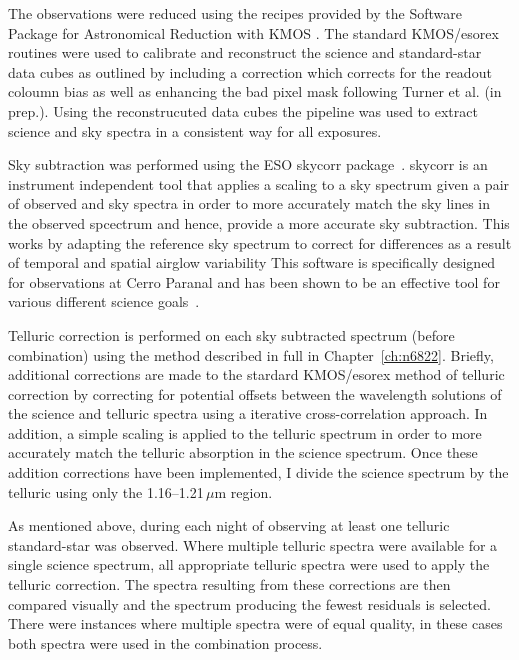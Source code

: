 The observations were reduced using the recipes provided by the Software Package for Astronomical Reduction with KMOS
\citep[SPARK;][]{2013A&A...558A..56D}.
The standard KMOS/esorex routines were used to calibrate and reconstruct the science and standard-star data cubes as outlined by
\cite{2013A&A...558A..56D} including a correction which corrects for the readout coloumn bias as well as enhancing the bad pixel mask following Turner et al. (in prep.).
Using the reconstrucuted data cubes the pipeline was used to extract science and sky spectra in a consistent way for all exposures.

Sky subtraction was performed using the ESO {\sc skycorr} package~\citep{2014A&A...567A..25N}.
{\sc skycorr} is an instrument independent tool that applies a scaling to a sky spectrum given a pair of observed and sky spectra in order to more accurately match the sky lines in the observed spcectrum and hence, provide a more accurate sky subtraction.
This works by adapting the reference sky spectrum to correct for differences as a result of temporal and spatial airglow variability
This software is specifically designed for observations at Cerro Paranal and has been shown to be an effective tool for various different science goals~\citep[e.g.][]{2014A&A...567A..25N,2015ApJ...805..182G,2016MNRAS.455.2028F,2016MNRAS.457.1468L}.

Telluric correction is performed on each sky subtracted spectrum (before combination) using the method described in full in Chapter~\ref{ch:n6822}.
Briefly, additional corrections are made to the stardard KMOS/esorex method of telluric correction by correcting for potential offsets between the wavelength solutions of the science and telluric spectra using a iterative cross-correlation approach.
In addition, a simple scaling is applied to the telluric spectrum in order to more accurately match the telluric absorption in the science spectrum.
Once these addition corrections have been implemented, I divide the science spectrum by the telluric using only the 1.16--1.21\,$\mu$m region.


As mentioned above, during each night of observing at least one telluric standard-star was observed.
Where multiple telluric spectra were available for a single science spectrum, all appropriate telluric spectra were used to apply the telluric correction.
The spectra resulting from these corrections are then compared visually and the spectrum producing the fewest residuals is selected.
There were instances where multiple spectra were of equal quality, in these cases both spectra were used in the combination process.

